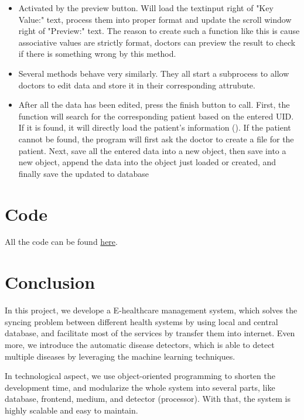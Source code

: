 \documentclass{article}
\begin{document}
\begin{itemize}
  \item {} Activated by the preview button. Will load the textinput right of "Key Value:" text, process them into proper format and update the scroll window right of "Preview:" text. The reason to create such a function like this is cause associative values are strictly format, doctors can preview the result to check if there is something wrong by this method.
  \item {} Several methods behave very similarly. They all start a subprocess to allow doctors to edit data and store it in their corresponding attrubute.
  \item {} After all the data has been edited, press the finish button to call. First, the function will search for the corresponding patient based on the entered UID. If it is found, it will directly load the patient's information (). If the patient cannot be found, the program will first ask the doctor to create a file for the patient. Next, save all the entered data into a new  object, then save  into a new  object, append the data into the  object just loaded or created, and finally save the updated  to database
\end{itemize}



\section{Code}
\label{sec:code}
All the code can be found \href{https://github.com/OEmiliatanO/E-health}{here}.

\section{Conclusion}
\label{sec:conclusion}
In this project, we develope a E-healthcare management system, which solves 
the syncing problem between different health systems by using local and 
central database, and facilitate most of the services by transfer them into 
internet. Even more, we introduce the automatic disease detectors, which 
is able to detect multiple diseases by leveraging the machine learning 
techniques. 

In technological aspect, we use object-oriented programming to shorten the 
development time, and modularize the whole system into several parts, like 
database, frontend, medium, and detector (processor). With that, the system 
is highly scalable and easy to maintain. 
\end{document}
